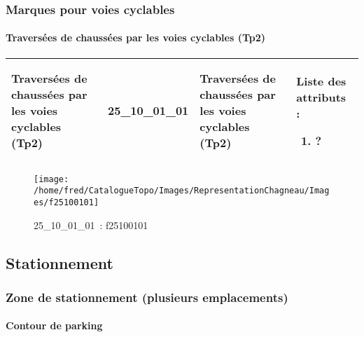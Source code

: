 \documentclass[12pt,titlepage]{book}
\begin{document}
\subsubsection{\large Marques pour voies cyclables}
\paragraph{Traversées de chaussées par les voies cyclables (Tp2)}
\noindent
\vspace{\baselineskip}

\renewcommand{\arraystretch}{1.2}
\begin{supertabular}{|p{10cm}|c|p{13cm}|p{12cm}|}
 Traversées de chaussées par les voies cyclables (Tp2) & 25\_10\_01\_01 & Traversées de chaussées par les voies cyclables (Tp2) & Liste des attributs :
\begin{enumerate}
  \item ?\end{enumerate}
\\
\hline
\end{supertabular}
\begin{figure}[h!]
  \hfill         %
  \begin{minipage}[t]{3cm}
    \begin{center}
      \texttt{[image: /home/fred/CatalogueTopo/Images/RepresentationChagneau/Images/f25100101]}
      \caption[~25\_10\_01\_01]{\small{25\_10\_01\_01~:} \tiny{f25100101}}\label{f25100101}
    \end{center}
  \end{minipage}
\end{figure}
\subsection{Stationnement}
\subsubsection{\large Zone de stationnement (plusieurs emplacements)}
\paragraph{Contour de parking}
\noindent
\vspace{\baselineskip}
\end{document}
